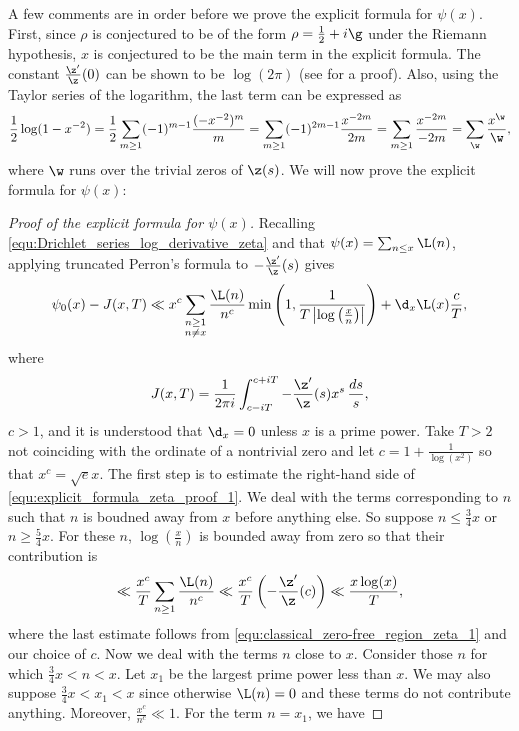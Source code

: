       A few comments are in order before we prove the explicit formula for $\psi(x)$. First, since $\rho$ is conjectured to be of the form $\rho = \frac{1}{2}+i\g$ under the Riemann hypothesis, $x$ is conjectured to be the main term in the explicit formula. The constant $\frac{\z'}{\z}(0)$ can be shown to be $\log(2\pi)$ (see \cite{davenport1980multiplicative} for a proof). Also, using the Taylor series of the logarithm, the last term can be expressed as
      \[
        \frac{1}{2}\log(1-x^{-2}) = \frac{1}{2}\sum_{m \ge 1}(-1)^{m-1}\frac{(-x^{-2})^{m}}{m} = \sum_{m \ge 1}(-1)^{2m-1}\frac{x^{-2m}}{2m} = \sum_{m \ge 1}\frac{x^{-2m}}{-2m} = \sum_{\w}\frac{x^{\w}}{\w},
      \]
      where $\w$ runs over the trivial zeros of $\z(s)$. We will now prove the explicit formula for $\psi(x)$:

      \begin{proof}[Proof of the explicit formula for $\psi(x)$]
        Recalling \cref{equ:Drichlet_series_log_derivative_zeta} and that $\psi(x) = \sum_{n \le x}\L(n)$, applying truncated Perron's formula to $-\frac{\z'}{\z}(s)$ gives
        \begin{equation}\label{equ:explicit_formula_zeta_proof_1}
          \psi_{0}(x)-J(x,T) \ll x^{c}\sum_{\substack{n \ge 1 \\ n \neq x}}\frac{\L(n)}{n^{c}}\min\left(1,\frac{1}{T\left|\log\left(\frac{x}{n}\right)\right|}\right)+\d_{x}\L(x)\frac{c}{T},
        \end{equation}
        where
        \[
          J(x,T) = \frac{1}{2\pi i}\int_{c-iT}^{c+iT}-\frac{\z'}{\z}(s)x^{s}\,\frac{ds}{s},
        \]
        $c > 1$, and it is understood that $\d_{x} = 0$ unless $x$ is a prime power. Take $T > 2$ not coinciding with the ordinate of a nontrivial zero and let $c = 1+\frac{1}{\log(x^{2})}$ so that $x^{c} = \sqrt{e}x$. The first step is to estimate the right-hand side of \cref{equ:explicit_formula_zeta_proof_1}. We deal with the terms corresponding to $n$ such that $n$ is boudned away from $x$ before anything else. So suppose $n \le \frac{3}{4}x$ or $n \ge \frac{5}{4}x$. For these $n$, $\log\left(\frac{x}{n}\right)$ is bounded away from zero so that their contribution is
        \begin{equation}\label{equ:explicit_formula_zeta_proof_2}
          \ll \frac{x^{c}}{T}\sum_{n \ge 1}\frac{\L(n)}{n^{c}} \ll \frac{x^{c}}{T}\left(-\frac{\z'}{\z}(c)\right) \ll \frac{x\log(x)}{T},
        \end{equation}
        where the last estimate follows from \cref{equ:classical_zero-free_region_zeta_1} and our choice of $c$. Now we deal with the terms $n$ close to $x$. Consider those $n$ for which $\frac{3}{4}x < n < x$. Let $x_{1}$ be the largest prime power less than $x$. We may also suppose $\frac{3}{4}x < x_{1} < x$ since otherwise $\L(n) = 0$ and these terms do not contribute anything. Moreover, $\frac{x^{c}}{n^{c}} \ll 1$. For the term $n = x_{1}$, we have

\end{proof}
